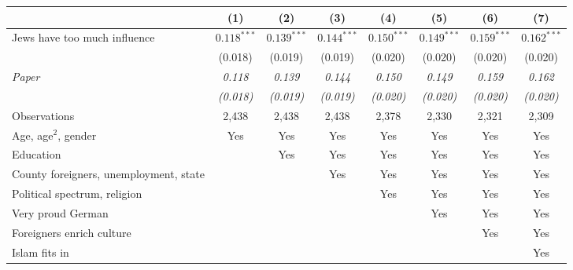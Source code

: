 \begin{tabular}{lccccccc}
\toprule
 & (1) & (2) & (3) & (4) & (5) & (6) & (7) \\
\midrule
Jews have too much influence & $0.118^{***}$ & $0.139^{***}$ & $0.144^{***}$ & $0.150^{***}$ & $0.149^{***}$ & $0.159^{***}$ & $0.162^{***}$ \\
 & (0.018) & (0.019) & (0.019) & (0.020) & (0.020) & (0.020) & (0.020) \\
\textit{Paper} & \textit{0.118} & \textit{0.139} & \textit{0.144} & \textit{0.150} & \textit{0.149} & \textit{0.159} & \textit{0.162} \\
 & \textit{(0.018)} & \textit{(0.019)} & \textit{(0.019)} & \textit{(0.020)} & \textit{(0.020)} & \textit{(0.020)} & \textit{(0.020)} \\
\midrule
Observations & 2,438 & 2,438 & 2,438 & 2,378 & 2,330 & 2,321 & 2,309 \\
Age, age$^2$, gender & Yes & Yes & Yes & Yes & Yes & Yes & Yes \\
Education &  & Yes & Yes & Yes & Yes & Yes & Yes \\
County foreigners, unemployment, state &  &  & Yes & Yes & Yes & Yes & Yes \\
Political spectrum, religion &  &  &  & Yes & Yes & Yes & Yes \\
Very proud German &  &  &  &  & Yes & Yes & Yes \\
Foreigners enrich culture &  &  &  &  &  & Yes & Yes \\
Islam fits in &  &  &  &  &  &  & Yes \\
\bottomrule
\end{tabular}
